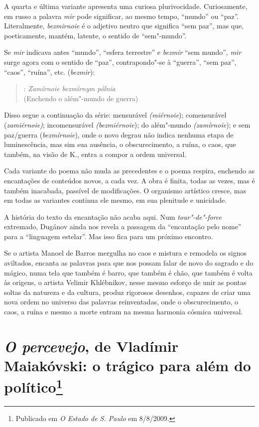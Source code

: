 {A quarta e última variante apresenta uma curiosa plurivocidade.
Curiosamente, em russo a palavra \emph{mir} pode significar, ao mesmo
tempo, ``mundo'' ou ``paz''. Literalmente, \emph{bezmirnoie} é o adjetivo
neutro que significa ``sem paz'', mas que, poeticamente, mantém,
latente, o sentido de ``sem"-mundo''.

Se \emph{mir} indicava antes ``mundo'', ``esfera terrestre'' e
\emph{bezmir} ``sem mundo'', \emph{mir} surge agora com o sentido de
``paz'', contrapondo"-se à ``guerra'', ``sem paz'', ``caos'', ``ruína'',
etc. (\emph{bezmir}):

\begin{verse}
: \emph{Zamírnoie bezmírnym pólnia} \\
(Enchendo o além"-mundo de guerra)
\end{verse}

Disso segue a continuação da série: mensurável \emph{(miérnoie});
comensurável (\emph{zamiérnoie)}; incomensurável \emph{(bezmiérnoie});
do além"-mundo \emph{(zamírnoie}); e sem paz/guerra (\emph{bezmírnoie}),
onde o novo degrau não indica nenhuma etapa de luminescência, mas sim
sua ausência, o obscurecimento, a ruína, o caos, que também, na visão de
K., entra a compor a ordem universal.

Cada variante do poema não muda as precedentes e o poema respira,
enchendo as encantações de conteúdos novos, a cada vez. A obra é finita,
todas as vezes, mas é também inacabada, passível de modificações. O
organismo artístico cresce, mas em todas as variantes continua ele
mesmo, em sua plenitude e unicidade.

A história do texto da encantação não acaba aqui. Num
\emph{tour"-de"-force} extremado, Dugánov ainda nos revela a passagem da
``encantação pelo nome'' para a ``linguagem estelar''. Mas isso fica
para um próximo encontro.

Se o artista Manoel de Barros mergulha no caos e mistura e remodela os
signos aviltados, encanta as palavras para que nos possam falar de novo
do sagrado e do mágico, numa tela que também é barro, que também é chão,
que também é volta às origens, o artista Velimir Khlébnikov, nesse mesmo
esforço de unir as pontas soltas da natureza e da cultura, produz
rigorosos desenhos, capazes de criar uma nova ordem no universo das
palavras reinventadas, onde o obscurecimento, o caos, a ruína e mesmo a
morte entram na mesma harmonia cósmica universal.

\chapter{\emph{O percevejo}, de Vladímir Maiakóvski: o trágico para além
do político\footnote{Publicado em \emph{O Estado de S. Paulo} em
  8/8/2009.}}

}
